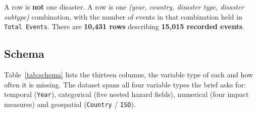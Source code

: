 \documentclass[11pt,a4paper]{article}
\begin{document}
A row is \textbf{not} one disaster. A row is one \emph{(year, country, disaster
type, disaster subtype)} combination, with the number of events in that
combination held in \texttt{Total Events}. There are \textbf{10{,}431 rows}
describing \textbf{15{,}015 recorded events}.

\subsection{Schema}

Table~\ref{tab:schema} lists the thirteen columns, the variable type of each and
how often it is missing. The dataset spans all four variable types the brief asks
for: temporal (\texttt{Year}), categorical (five nested hazard fields),
numerical (four impact measures) and geospatial (\texttt{Country} /
\texttt{ISO}).
\end{document}
